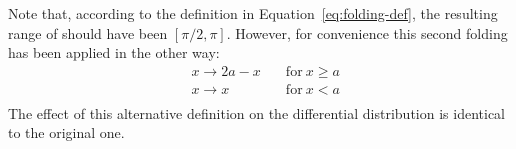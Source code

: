 Note that, according to the definition in Equation~\ref{eq:folding-def}, the resulting range of \TL should have been $\left[\pi/2,\pi\right]$.
However, for convenience this second folding has been applied in the other way:
\begin{equation} \label{eq:folding-def-alt}
  \begin{aligned}
    & x \to 2a-x \quad & \textrm{for}\: x \ge a \\
    & x \to x \quad & \textrm{for}\: x < a \\
  \end{aligned}
\end{equation}
The effect of this alternative definition on the differential distribution is identical to the original one.



